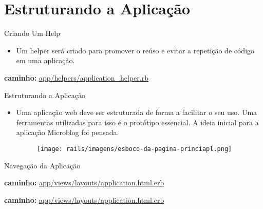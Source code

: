 \section{Estruturando a Aplicação}
\begin{frame}[fragile,t]{Criando Um Help}
    \begin{itemize}
      \item  Um helper será criado para promover o reúso e evitar a repetição 
        de código em uma aplicação. 
    \end{itemize}
    \begin{exampleblock}{\tiny\textbf{caminho: }\url{app/helpers/application_helper.rb}}
      
  \end{exampleblock}
\end{frame} 
\begin{frame}[fragile,t]{Estruturando a Aplicação}
    \begin{itemize}
      \item  Uma aplicação web deve ser estruturada de forma a facilitar o seu uso.
        Uma ferramentas utilizadas para isso é o protótipo essencial. A ideia inicial
        para a aplicação Microblog foi pensada. 
      \begin{figure}[h!]
        \centering
        \texttt{[image: rails/imagens/esboco-da-pagina-princiapl.png]}
      \end{figure}
    \end{itemize}
\end{frame} 
\begin{frame}{Navegação da Aplicação}
  \begin{exampleblock}{\tiny\textbf{caminho: }\url{app/views/layouts/application.html.erb}}
      
  \end{exampleblock}
  \framebreak
  \begin{exampleblock}{\tiny\textbf{caminho: }\url{app/views/layouts/application.html.erb}}
      
  \end{exampleblock}
\end{frame} 

